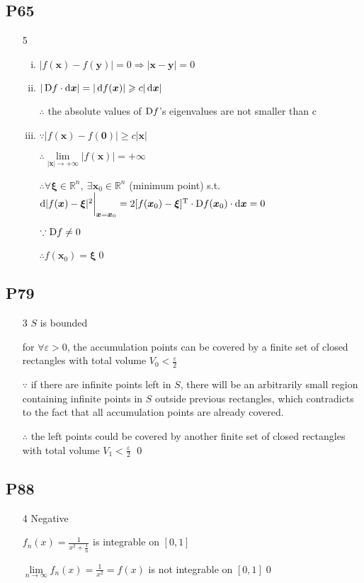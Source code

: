 \subsection{P65}
\begin{enumerate}[1]
\item[5]
    \begin{enumerate}[(i)]
    \item
    $|f(\bm{x})-f(\bm{y})|=0 \Rightarrow |\bm{x}-\bm{y}|=0 $

    \item
    $|\Dif f \cdot \dif \bm{x}|=|\dif f(\bm{x})| \geqslant c|\dif\bm{x}|$
    \par $\therefore$ the absolute values of $\Dif f$'s eigenvalues are not smaller than c 

    \item
    $\because | f(\bm{x}) - f(\bm{0})| \geqslant c|\bm{x}| $
    \par $\therefore \lim \limits_{|\bm{x}|\to +\infty} | f(\bm{x}) | = +\infty $
    \par $\therefore \forall \bm{\xi} \in \mathbb{R}^n,\ \exists \bm{x}_0 \in \mathbb{R}^n $ (minimum point) s.t. $ \dif |f(\bm{x})-\bm{\xi}|^2\bigg|_{\bm{x} = \bm{x}_0}  = 2 [f(\bm{x}_0)-\bm{\xi}]^\text{T} \cdot\Dif f(\bm{x}_0)\cdot\dif \bm{x} = 0 $ 
    \par $\because \Dif f \not= 0 $
    \par $\therefore f(\bm{x}_0)=\bm{\xi} $\qed

    \end{enumerate}
\end{enumerate}

\subsection{P79}
\begin{enumerate}[1]
    \item[3]
    $S$ is bounded 
    \par for $\forall \varepsilon >0 $, the accumulation points can be covered by a finite set of closed rectangles with total volume $V_0 <\frac{\varepsilon}{2}$
    \par $\because$ if there are infinite points left in $S$, there will be an arbitrarily small region containing infinite points in $S$ outside previous rectangles, which contradicts to the fact that all accumulation points are already covered.
    \par $\therefore$ the left points could be covered by another finite set of closed rectangles with total volume $V_1 <\frac{\varepsilon}{2}$ \qed
\end{enumerate}

\subsection{P88}
\begin{enumerate}[1]
    \item[4]
    Negative
    \par $f_n(x) = \frac{1}{x^2 + \frac{1}{n} } $ is integrable on $[0,1]$
    \par $ \lim \limits_{n\to \infty} f_n(x) = \frac{1}{x^2} = f(x) $ is not integrable on  $[0,1]$\qed
\end{enumerate}
